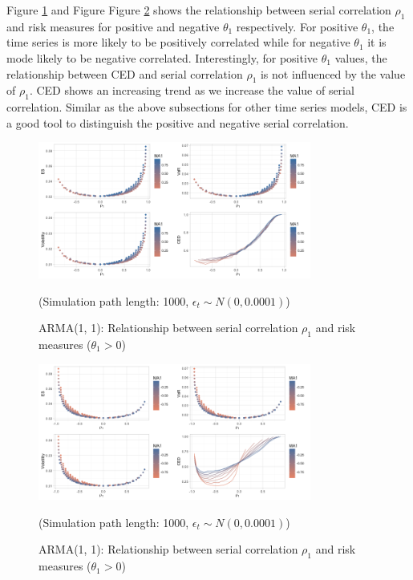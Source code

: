 \documentclass[11pt]{article}
\begin{document}
Figure \ref{fig:AR1MA1_risk_measures_pos} and Figure Figure \ref{fig:AR1MA1_risk_measures_neg} shows the relationship between serial correlation $\rho_1$ and risk measures for positive and negative $\theta_1$ respectively. For positive $\theta_1$, the time series is more likely to be positively correlated while for negative $\theta_1$ it is mode likely to be negative correlated. Interestingly, for positive $\theta_1$ values, the relationship between CED and serial correlation $\rho_1$ is not influenced by the value of $\rho_1$. CED shows an increasing trend as we increase the value of serial correlation. Similar as the above subsections for other time series models, CED is a good tool to distinguish the positive and negative serial correlation.

\begin{figure}[H]
\centering
\includegraphics[width = 0.8\textwidth]{../figures/simulation/AR1MA1_risk_measures_pos}
\caption{ARMA(1, 1): Relationship between serial correlation $\rho_1$ and risk measures ($\theta_1>0$)}
(Simulation path length: 1000, $\epsilon_t \sim N(0, 0.0001)$)
\label{fig:AR1MA1_risk_measures_pos}
\end{figure}

\begin{figure}[H]
\centering
\includegraphics[width = 0.8\textwidth]{../figures/simulation/AR1MA1_risk_measures_neg}
\caption{ARMA(1, 1): Relationship between serial correlation $\rho_1$ and risk measures ($\theta_1>0$)}
(Simulation path length: 1000, $\epsilon_t \sim N(0, 0.0001)$)
\label{fig:AR1MA1_risk_measures_neg}
\end{figure}
\end{document}
